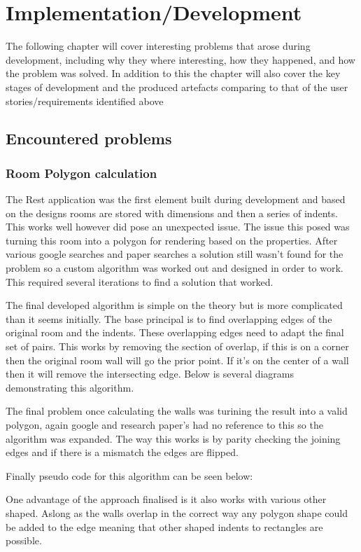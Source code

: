 \section{Implementation/Development}
The following chapter will cover interesting problems that arose during development, including why they where interesting, how they happened, and how the problem was solved. In addition to this the chapter will also cover the key stages of development and the produced artefacts comparing to that of the user stories/requirements identified above

\subsection{Encountered problems} %
\subsubsection{Room Polygon calculation}
The Rest application was the first element built during development and based on the designs rooms are stored with dimensions and then a series of indents. This works well however did pose an unexpected issue. The issue this posed was turning this room into a polygon for rendering based on the properties. After various google searches and paper searches a solution still wasn't found for the problem so a custom algorithm was worked out and designed in order to work. This required several iterations to find a solution that worked.

The final developed algorithm is simple on the theory but is more complicated than it seems initially. The base principal is to find overlapping edges of the original room and the indents. These overlapping edges need to adapt the final set of pairs. This works by removing the section of overlap, if this is on a corner then the original room wall will go the prior point. If it's on the center of a wall then it will remove the intersecting edge. Below is several diagrams demonstrating this algorithm.

The final problem once calculating the walls was turining the result into a valid polygon, again google and research paper's had no reference to this so the algorithm was expanded. The way this works is by parity checking the joining edges and if there is a mismatch the edges are flipped.

Finally pseudo code for this algorithm can be seen below:

One advantage of the approach finalised is it also works with various other shaped. Aslong as the walls overlap in the correct way any polygon shape could be added to the edge meaning that other shaped indents to rectangles are possible.

